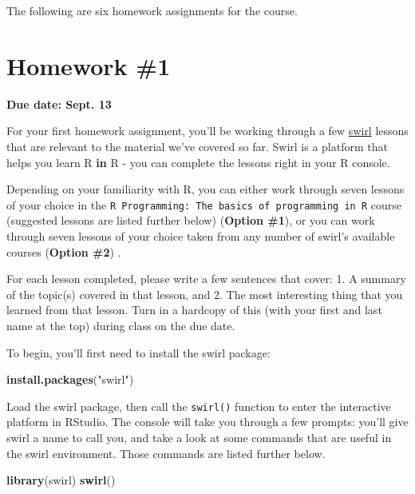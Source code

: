 \documentclass[]{book}
\makeatletter
\newenvironment{Shaded}{\begin{snugshade}}{\end{snugshade}}
\newcommand{\KeywordTok}[1]{\textcolor[rgb]{0.13,0.29,0.53}{\textbf{#1}}}
\newcommand{\StringTok}[1]{\textcolor[rgb]{0.31,0.60,0.02}{#1}}
\newcommand{\NormalTok}[1]{#1}
\newenvironment{kframe}{%
\medskip{}
\setlength{\fboxsep}{.8em}
 \def\at@end@of@kframe{}%
 \ifinner\ifhmode%
  \def\at@end@of@kframe{\end{minipage}}%
  \begin{minipage}{\columnwidth}%
 \fi\fi%
 \def\FrameCommand##1{\hskip\@totalleftmargin \hskip-\fboxsep
 \colorbox{shadecolor}{##1}\hskip-\fboxsep
     \hskip-\linewidth \hskip-\@totalleftmargin \hskip\columnwidth}%
 \MakeFramed {\advance\hsize-\width
   \@totalleftmargin\z@ \linewidth\hsize
   \@setminipage}}%
 {\par\unskip\endMakeFramed%
 \at@end@of@kframe}
\renewenvironment{Shaded}{\begin{kframe}}{\end{kframe}}
\theoremstyle{definition}
\theoremstyle{definition}
\theoremstyle{definition}
\theoremstyle{remark}
\makeatother
\begin{document}
The following are six homework assignments for the course.

\section{Homework \#1}\label{homework-1}

\textbf{Due date: Sept. 13}

For your first homework assignment, you'll be working through a few
\href{http://swirlstats.com/}{swirl} lessons that are relevant to the
material we've covered so far. Swirl is a platform that helps you learn
R \textbf{in} R - you can complete the lessons right in your R console.

Depending on your familiarity with R, you can either work through seven
lessons of your choice in the
\texttt{R\ Programming:\ The\ basics\ of\ programming\ in\ R} course
(suggested lessons are listed further below) (\textbf{Option \#1}), or
you can work through seven lessons of your choice taken from any number
of swirl's available courses (\textbf{Option \#2}) .

For each lesson completed, please write a few sentences that cover: 1. A
summary of the topic(s) covered in that lesson, and 2. The most
interesting thing that you learned from that lesson. Turn in a hardcopy
of this (with your first and last name at the top) during class on the
due date.

To begin, you'll first need to install the swirl package:

\begin{Shaded}
\begin{Highlighting}[]
\KeywordTok{install.packages}\NormalTok{(}\StringTok{"swirl"}\NormalTok{)}
\end{Highlighting}
\end{Shaded}

Load the swirl package, then call the \texttt{swirl()} function to enter
the interactive platform in RStudio. The console will take you through a
few prompts: you'll give swirl a name to call you, and take a look at
some commands that are useful in the swirl environment. Those commands
are listed further below.

\begin{Shaded}
\begin{Highlighting}[]
\KeywordTok{library}\NormalTok{(swirl)}
\KeywordTok{swirl}\NormalTok{()}
\end{Highlighting}
\end{Shaded}
\end{document}
